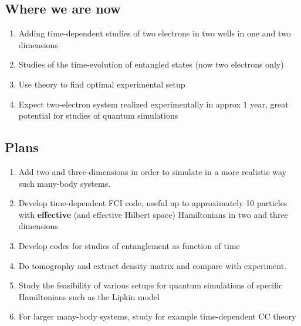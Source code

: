 \documentclass[%
oneside,                 %
final,                   %
10pt]{article}
\begin{document}
\vspace{6mm}

\subsection{Where we are now}

\begin{enumerate}
\item Adding time-dependent studies of two electrons in two wells in one and two dimensions

\item Studies of the time-evolution of entangled states (now two electrons only)

\item Use theory to find optimal experimental setup

\item Expect two-electron system realized experimentally in approx $1$ year, great potential for studies of quantum simulations
\end{enumerate}

\noindent
\subsection{Plans}

\begin{enumerate}
\item Add two and three-dimensions in order to simulate in  a more realistic way such many-body systems.

\item Develop time-dependent FCI code, useful up to approximately 10 particles with \textbf{effective} (and effective Hilbert space) Hamiltonians in two and three dimensions

\item Develop codes for studies of entanglement as function of time

\item Do tomogrophy and extract density matrix and compare with experiment.

\item Study the feasibility of various setups for quantum simulations of specific Hamiltonians such as the Lipkin model

\item For larger many-body systems, study for example time-dependent CC theory
\end{enumerate}

\noindent
\end{document}
